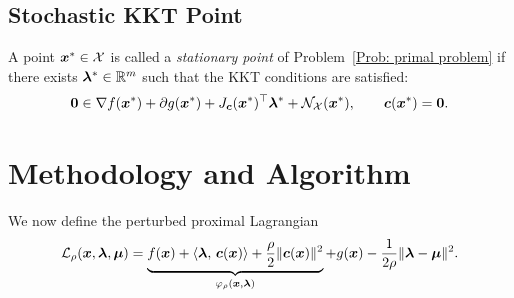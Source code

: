 \documentclass[10pt]{article}
\newcommand{\calE}{\mathcal{E}}
\newcommand{\calI}{\mathcal{I}}
\begin{document}
\subsection{Stochastic KKT Point}
\begin{definition}
\label{def:stationary}
A point $\bm{x}^* \in \mathcal{X}$ is called a \emph{stationary point} of
Problem~\eqref{Prob: primal problem} if there exists $\bm{\lambda}^* \in \mathbb{R}^m$
such that the KKT conditions are satisfied:
\begin{equation}
    \mathbf{0} \in \nabla f(\bm{x}^*) + \partial g(\bm{x}^*)
    + J_{\bm{c}}(\bm{x}^*)^\top \bm{\lambda}^* + \mathcal{N}_{\mathcal{X}}(\bm{x}^*),
    \qquad \bm{c}(\bm{x}^*) = \mathbf{0}.
\end{equation}
\end{definition}
\section{Methodology and Algorithm}
\label{sec:method}

We now define the perturbed proximal Lagrangian
\begin{equation}\label{eq:reduced_ppl}
    \mathcal{L}_{\rho}(\bm{x}, \bm{\lambda}, \bm{\mu})
    = \underbrace{f(\bm{x}) + \langle \bm{\lambda},\, \bm{c}(\bm{x}) \rangle + \frac{\rho}{2}\|\bm{c}(\bm{x})\|^2}_{\varphi_{\rho}(\bm{x}, \bm{\lambda})} + g(\bm{x}) - \frac{1}{2\rho}\|\bm{\lambda} - \bm{\mu}\|^2.
\end{equation} 
\end{document}
